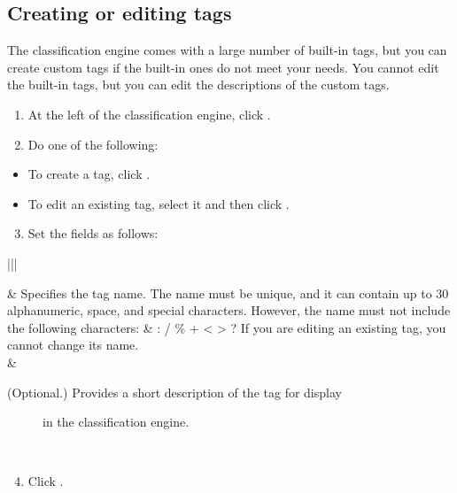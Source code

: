 \documentclass[letterpaper,10pt,english]{sphinxmanual}
\begin{document}
\subsection{Creating or editing tags}
\label{\detokenize{mcdmp_app_ug:creating-or-editing-tags}}
The classification engine comes with a large number of built-in tags, but you can create custom tags if the built-in ones do not meet your needs.
You cannot edit the built-in tags, but you can edit the descriptions of the custom tags.

\begin{enumerate}
\item {} 
At the left of the classification engine, click .

\item {} 
Do one of the following:

\end{enumerate}
\begin{itemize}
\item {} 
To create a tag, click .

\item {} 
To edit an existing tag, select it and then click .

\end{itemize}
\begin{enumerate}
\setcounter{enumi}{2}
\item {} 
Set the fields as follows:

\end{enumerate}


\begin{savenotes}\sphinxattablestart
\centering
\begin{tabular}[t]{|*{2}{|}}
\hline

&
Specifies the tag name. The name must be unique, and it can
contain up to 30 alphanumeric, space, and special characters.
However, the name must not include the following characters:
\& : / \% + \textless{} \textgreater{} ?
If you are editing an existing tag, you cannot change its name.
\\
\hline
{}
&\begin{description}
\item[{(Optional.) Provides a short description of the tag for display}] \leavevmode
in the classification engine.

\end{description}
\\
\hline
\end{tabular}
\par
\sphinxattableend\end{savenotes}
\begin{enumerate}
\setcounter{enumi}{3}
\item {} 
Click .

\end{enumerate}
\end{document}
